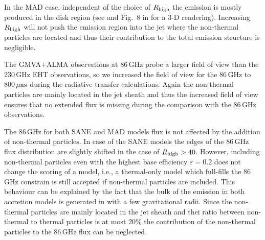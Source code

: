 
In the MAD case, independent of the choice of $R_\mathrm{high}$ the emission is mostly produced in the disk region (see  and Fig.~8 in \citet{Wong_2022} for a 3-D rendering). Increasing $R_\mathrm{high}$ will not push the emission region into the jet where the non-thermal particles are located and thus their contribution to the total emission structure is negligible.


The GMVA+ALMA observations at 86\,GHz \cite{2021ApJ...915...99I}  probe a larger field of view than the 230\,GHz EHT observations, so we increased the field of view for the 86\,GHz to 800\,$\rm{\mu as}$ during the radiative transfer calculations. Again the non-thermal particles are mainly located in the jet sheath and thus the increased field of view ensures that no extended flux is missing during the comparison with the 86\,GHz observations.

The 86\,GHz for both SANE and MAD models flux is not affected by the addition of non-thermal particles. In case of the SANE models the edges of the 86\,GHz flux distribution are slightly shifted in the case of $R_\mathrm{high}>40$. However, including non-thermal particles even with the highest base efficiency $\varepsilon=0.2$ does not change the scoring of a model, i.e., a thermal-only model which full-fills the 86\,GHz constrain is still accepted if non-thermal particles are included. This behaviour can be explained by the fact that the bulk of the emission in both accretion models is generated in with a few gravitational radii. Since the non-thermal particles are mainly located in the jet sheath and thei ratio between non-thermal to thermal particles is at most 20\% the contribution of the non-thermal particles to the 86\,GHz flux can be neglected.


